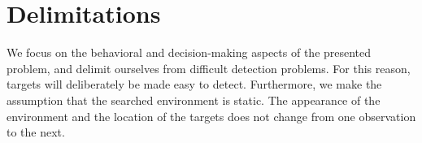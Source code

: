 \section{Delimitations}
\label{sec:delimitations}


We focus on the behavioral and decision-making aspects of the presented problem, and delimit ourselves from difficult detection problems.
For this reason, targets will deliberately be made easy to detect.
Furthermore, we make the assumption that the searched environment is static.
The appearance of the environment and the location of the targets does not change from one observation to the next.

